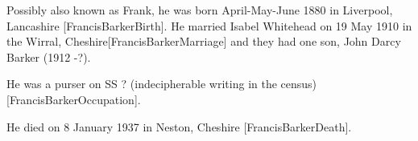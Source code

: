
Possibly also known as Frank, he was born April-May-June 1880 in Liverpool, Lancashire [FrancisBarkerBirth]. He married Isabel Whitehead on 19 May 1910 in the Wirral, Cheshire[FrancisBarkerMarriage] and they had one son, John Darcy Barker (1912 -?). 

He was a purser on SS ? (indecipherable writing in the census)[FrancisBarkerOccupation].

He died on 8 January 1937 in	Neston, Cheshire [FrancisBarkerDeath].
